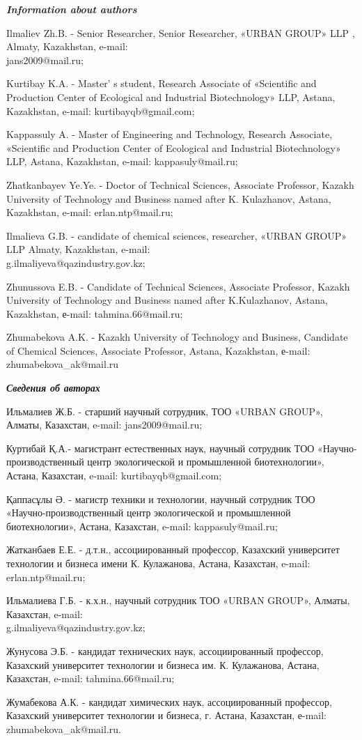 \begin{authorinfo}
\hspace{1em}\emph{{\bfseries Information about authors}}

Ilmaliev Zh.B. - Senior Researcher, Senior Researcher, «URBAN GROUP» LLP
, Almaty, Kazakhstan, e-mail:\\ jans2009@mail.ru;

Kurtibay K.A. - Master' s student, Research Associate of
«Scientific and Production Center of Ecological and Industrial
Biotechnology» LLP, Astana, Kazakhstan, e-mail:
kurtibayqb@gmail.com;

Kappassuly A. - Master of Engineering and Technology, Research
Associate, «Scientific and Production Center of Ecological and
Industrial Biotechnology» LLP, Astana, Kazakhstan, e-mail:
kappasuly@mail.ru;

Zhatkanbayev Ye.Ye. - Doctor of Technical Sciences, Associate Professor,
Kazakh University of Technology and Business named after K. Kulazhanov,
Astana, Kazakhstan, e-mail: erlan.ntp@mail.ru;

Ilmalieva G.B. - candidate of chemical sciences, researcher, «URBAN
GROUP» LLP Almaty, Kazakhstan, e-mail:\\ g.ilmaliyeva@qazindustry.gov.kz;

Zhunussova E.B. - Candidate of Technical Sciences, Associate Professor,
Kazakh University of Technology and Business named after K.Kulazhanov,
Astana, Kazakhstan, е-mail: tahmina.66@mail.ru;

Zhumabekova A.K. - Kazakh University of Technology and Business,
Candidate of Chemical Sciences, Associate Professor, Astana, Kazakhstan,
е-mail: zhumabekova\_ak@mail.ru

\hspace{1em}\emph{{\bfseries Сведения об авторах}}

Ильмалиев Ж.Б. - старший научный сотрудник, ТОО «URBAN GROUP», Алматы,
Казахстан, e-mail: jans2009@mail.ru;

Куртибай Қ.А.- магистрант естественных наук, научный сотрудник ТОО
«Научно-производственный центр экологической и промышленной
биотехнологии», Астана, Казахстан, e-mail: kurtibayqb@gmail.com;

Қаппасұлы Ә. - магистр техники и технологии, научный сотрудник ТОО
«Научно-производственный центр экологической и промышленной
биотехнологии», Астана, Казахстан, e-mail: kappasuly@mail.ru;

Жатканбаев Е.Е. - д.т.н., ассоциированный профессор, Казахский университет
технологии и бизнеса имени К. Кулажанова, Астана, Казахстан, e-mail:
erlan.ntp@mail.ru;

Ильмалиева Г.Б. - к.х.н., научный сотрудник ТОО «URBAN GROUP», Алматы,
Казахстан, e-mail: \\g.ilmaliyeva@qazindustry.gov.kz;

Жунусова Э.Б. - кандидат технических наук, ассоциированный профессор,
Казахский университет технологии и бизнеса им. К. Кулажанова, Астана,
Казахстан, e-mail: tahmina.66@mail.ru;

Жумабекова А.К. - кандидат химических наук, ассоциированный профессор,
Казахский университет технологии и бизнеса, г. Астана, Казахстан,
е-mail: zhumabekova\_ak@mail.ru.
\end{authorinfo}
